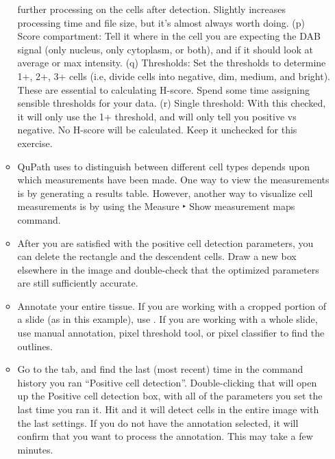 \documentclass[a4paper,12pt]{article}
\begin{document}
\begin{enumerate}
\begin{itemize}
further processing on the cells after detection. Slightly increases processing time and file size, but it’s almost always worth doing. (p) Score compartment: Tell it where in the cell you are expecting the DAB signal (only nucleus, only cytoplasm, or both), and if it should look at average or max intensity. (q) Thresholds: Set the thresholds to determine 1+, 2+, 3+ cells (i.e, divide cells into negative, dim, medium, and bright). These are essential to calculating H-score. Spend some time assigning sensible thresholds for your data. (r) Single threshold: With this checked, it will only use the 1+ threshold, and will only tell you positive vs negative. No H-score will be calculated. Keep it unchecked for this exercise.
    \item QuPath uses to distinguish between different cell types depends upon which measurements have been made. One way to view the measurements is by generating a results table. However, another way to visualize cell measurements is by using the Measure ‣ Show measurement maps command.
    \item After you are satisfied with the positive cell detection parameters, you can delete the rectangle and the descendent cells. Draw a new box elsewhere in the image and double-check that the optimized parameters are still sufficiently accurate.
    \item Annotate your entire tissue. If you are working with a cropped portion of a slide (as in this example), use \soln {} \solnend. If you are working with a whole slide, use manual annotation, pixel threshold tool, or pixel classifier to find the outlines. 
    \item Go to the \soln {} \solnend tab, and find the last (most recent) time in the command history you ran “Positive cell detection”. Double-clicking that will open up the Positive cell detection box, with all of the parameters you set the last time you ran it. Hit \soln {} \solnend and it will detect cells in the entire image with the last settings. If you do not have the annotation selected, it will confirm that you want to process the annotation. This may take a few minutes. 
    \end{itemize}   
    

\end{enumerate}
\end{document}
